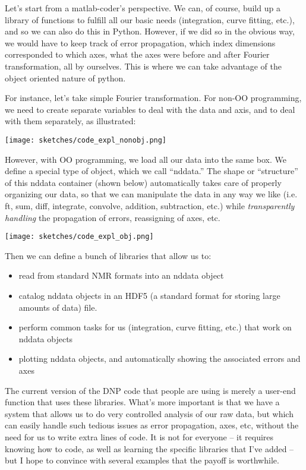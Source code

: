 Let's start from a matlab-coder's perspective.
We can, of course, build up a library of functions to fulfill all our basic needs (integration, curve fitting, etc.), and so we can also do this in Python.
However, if we did so in the obvious way, we would have to keep track of error propagation, which index dimensions corresponded to which axes, what the axes were before and after Fourier transformation, all by ourselves.
This is where we can take advantage of the object oriented nature of python.

For instance, let's take simple Fourier transformation.
For non-OO programming, we need to create separate variables to deal with the data and axis,
    and to deal with them separately, as illustrated:
    \begin{center}
        \texttt{[image: sketches/code\_expl\_nonobj.png]}
    \end{center}
However, with OO programming, we load all our data into the same box.
We define a special type of object, which we call ``nddata.''
The shape or ``structure'' of this nddata container (shown below) automatically takes care
    of properly organizing our data,
    so that we can
    manipulate the data in any way we like
    (i.e. ft, sum, diff, integrate, convolve, addition, subtraction, etc.)
    while {\it transparently handling} the propagation of errors, reassigning of axes, etc.
    \begin{center}
        \texttt{[image: sketches/code\_expl\_obj.png]}
    \end{center}


Then we can define a bunch of libraries that allow us to:
\begin{itemize}
    \item read from standard NMR formats into an nddata object
    \item catalog nddata objects in an HDF5 (a standard format for storing large amounts of data) file.
    \item perform common tasks for us (integration, curve fitting, etc.) that work on nddata objects 
    \item plotting nddata objects, and automatically showing the associated errors and axes 
\end{itemize}

The current version of the DNP code that people are using is merely a user-end function that uses these libraries.
What's more important is that we have a system that allows us to do very controlled analysis of our raw data, but which can easily handle such tedious issues as error propagation, axes, etc, without the need for us to write extra lines of code.
It is not for everyone -- it requires knowing how to code, as well as learning the specific libraries that I've added -- but I hope to convince with several examples that the payoff is worthwhile.

